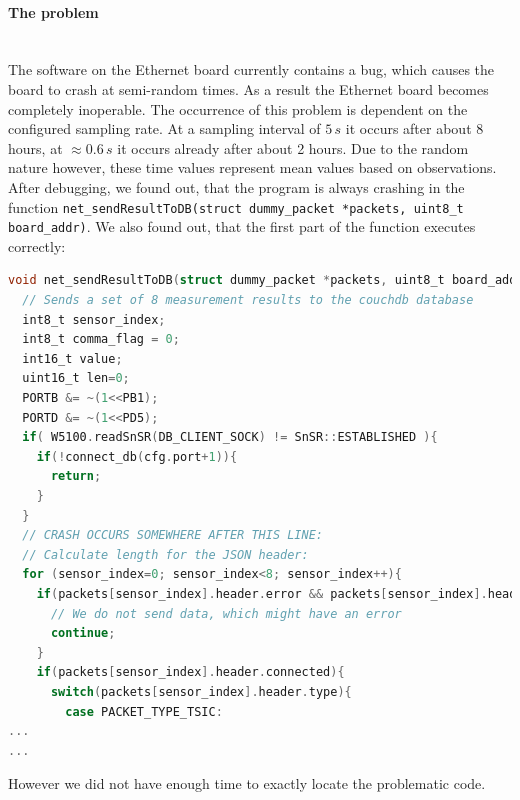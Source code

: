 \documentclass[a4paper]{scrreprt}
\begin{document}
\paragraph{The problem}\hspace{1cm}\\
The software on the Ethernet board currently contains a bug, which causes the board to
crash at semi-random times. As a result the Ethernet board becomes completely inoperable.
The occurrence of this problem is dependent on the configured sampling rate. At a sampling
interval of $5\,s$ it occurs after about 8 hours, at $\approx0.6\,s$ it occurs already after about
2 hours. Due to the random nature however, these time values represent mean values based on
observations.\\
After debugging, we found out, that the program is always crashing in the function
\texttt{net\_sendResultToDB(struct dummy\_packet *packets, uint8\_t board\_addr)}. We also found out, that the first part of the function executes correctly:
\lstset{style=customc}
\begin{lstlisting}[language=C, framextopmargin=10pt, framexbottommargin=10pt]
void net_sendResultToDB(struct dummy_packet *packets, uint8_t board_addr){
  // Sends a set of 8 measurement results to the couchdb database
  int8_t sensor_index;
  int8_t comma_flag = 0;
  int16_t value;
  uint16_t len=0;
  PORTB &= ~(1<<PB1);
  PORTD &= ~(1<<PD5);
  if( W5100.readSnSR(DB_CLIENT_SOCK) != SnSR::ESTABLISHED ){
    if(!connect_db(cfg.port+1)){
      return;
    }
  }
  // CRASH OCCURS SOMEWHERE AFTER THIS LINE:
  // Calculate length for the JSON header:
  for (sensor_index=0; sensor_index<8; sensor_index++){
    if(packets[sensor_index].header.error && packets[sensor_index].header.connected){
      // We do not send data, which might have an error
      continue;
    }
    if(packets[sensor_index].header.connected){
      switch(packets[sensor_index].header.type){
        case PACKET_TYPE_TSIC:
...
...
\end{lstlisting}
However we did not have enough time to exactly locate the problematic code.
\end{document}
